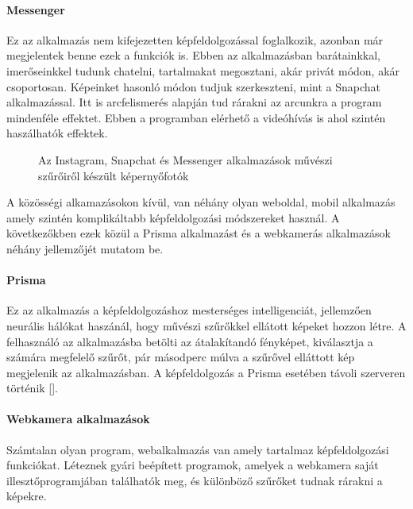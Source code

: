 \paragraph{Messenger} 

Ez az alkalmazás nem kifejezetten képfeldolgozással foglalkozik, azonban már megjelentek benne ezek a funkciók is. Ebben az alkalmazásban barátainkkal, imerőseinkkel tudunk chatelni, tartalmakat megosztani, akár privát módon, akár csoportosan. Képeinket hasonló módon tudjuk szerkeszteni, mint a Snapchat alkalmazással. Itt is arcfelismerés alapján tud rárakni az arcunkra a program mindenféle effektet. Ebben a programban elérhető a videóhívás is ahol szintén haszálhatók effektek.

\begin{figure}[ht]
\centering
{}
\caption{Az Instagram, Snapchat és Messenger alkalmazások művészi szűrőiről készült képernyőfotók} 
\label{fig:social_media}
\end{figure}


A közösségi alkamazásokon kívül, van néhány olyan weboldal, mobil alkalmazás amely szintén komplikáltabb képfeldolgozási módszereket használ. A következőkben ezek közül a Prisma alkalmazást és a webkamerás alkalmazások néhány jellemzőjét mutatom be.

\paragraph{Prisma}

Ez az alkalmazás a képfeldolgozáshoz mesterséges intelligenciát, jellemzően neurális hálókat haszánál, hogy művészi szűrőkkel ellátott képeket hozzon létre. A felhasználó az alkalmazásba betölti az átalakítandó fényképet, kiválasztja a számára megfelelő szűrőt, pár másodperc múlva a szűrővel elláttott kép megjelenik az alkalmazásban. A képfeldolgozás a Prisma esetében távoli szerveren történik [].

\paragraph{Webkamera alkalmazások} 

Számtalan olyan program, webalkalmazás van amely tartalmaz képfeldolgozási funkciókat. Léteznek gyári beépített programok, amelyek a webkamera saját illesztőprogramjában találhatók meg, és különböző szűrőket tudnak rárakni a képekre.

